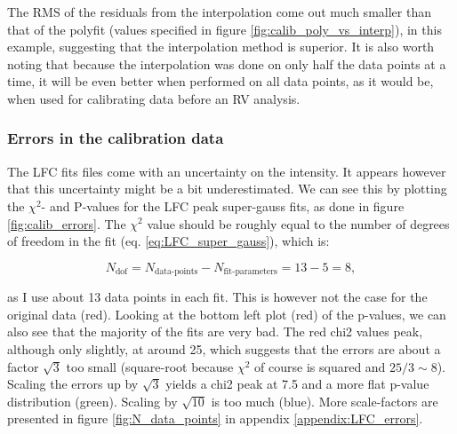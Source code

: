     The RMS of the residuals from the interpolation come out much smaller than that of the polyfit (values specified in figure \ref{fig:calib_poly_vs_interp}), in this example, suggesting that the interpolation method is superior. It is also worth noting that because the interpolation was done on only half the data points at a time, it will be even better when performed on all data points, as it would be, when used for calibrating data before an RV analysis.

    \vspace{0.5cm}


    




    \subsubsection{Errors in the calibration data}

    The LFC fits files come with an uncertainty on the intensity. It appears however that this uncertainty might be a bit underestimated. We can see this by plotting the $\chi^2$- and P-values for the LFC peak super-gauss fits, as done in figure \ref{fig:calib_errors}. The $\chi^2$ value should be roughly equal to the number of degrees of freedom in the fit (eq. \ref{eq:LFC_super_gauss}), which is: 

    \begin{equation}
        \label{eq:ndof}
        N_\text{dof} = N_\text{data-points} - N_\text{fit-parameters} =  13 - 5 = 8,
    \end{equation}

    as I use about 13 data points in each fit. This is however not the case for the original data (red). Looking at the bottom left plot (red) of the p-values, we can also see that the majority of the fits are very bad. The red chi2 values peak, although only slightly, at around 25, which suggests that the errors are about a factor $\sqrt{3}$ too small (square-root because $\chi^2$ of course is squared and $25/3 \sim 8$). Scaling the errors up by $\sqrt{3}$ yields a chi2 peak at 7.5 and a more flat p-value distribution (green). Scaling by $\sqrt{10}$ is too much (blue). More scale-factors are presented in figure \ref{fig:N_data_points} in appendix \ref{appendix:LFC_errors}. 
                
